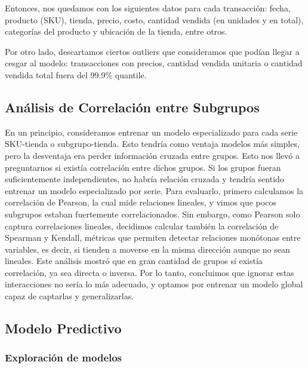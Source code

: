 \documentclass[12pt,a4paper]{article}
\begin{document}
\vspace{0.2cm}

Entonces, nos quedamos con los siguientes datos para cada transacción: fecha, producto (SKU), tienda, 
precio, costo, cantidad vendida (en unidades y en total), categorías del producto y ubicación de la tienda, entre otros.

\vspace{0.2cm}

Por otro lado, descartamos ciertos outliers que consideramos que podían llegar a cesgar al modelo: transacciones con precios, 
cantidad vendida unitaria o cantidad vendida total fuera del 99.9\% quantile.

\vspace{0.2cm}

\subsection{Análisis de Correlación entre Subgrupos}

En un principio, consideramos entrenar un modelo especializado para cada serie SKU-tienda o subgrupo-tienda. Esto tendría como ventaja modelos más simples, pero la desventaja era perder información cruzada entre grupos. Esto nos llevó a preguntarnos si existía correlación entre dichos grupos.  
Si los grupos fueran suficientemente independientes, no habría relación cruzada y tendría sentido entrenar un modelo especializado por serie. Para evaluarlo, primero calculamos la correlación de Pearson, la cual mide relaciones lineales, y vimos que pocos subgrupos estaban fuertemente correlacionados.  
Sin embargo, como Pearson solo captura correlaciones lineales, decidimos calcular también la correlación de Spearman y Kendall, métricas que permiten detectar relaciones monótonas entre variables, es decir, si tienden a moverse en la misma dirección aunque no sean lineales.  
Este análisis mostró que en gran cantidad de grupos sí existía correlación, ya sea directa o inversa. Por lo tanto, concluimos que ignorar estas interacciones no sería lo más adecuado, y optamos por entrenar un modelo global capaz de captarlas y generalizarlas.

\subsection{Modelo Predictivo}

    \subsubsection{Exploración de modelos}
\end{document}
